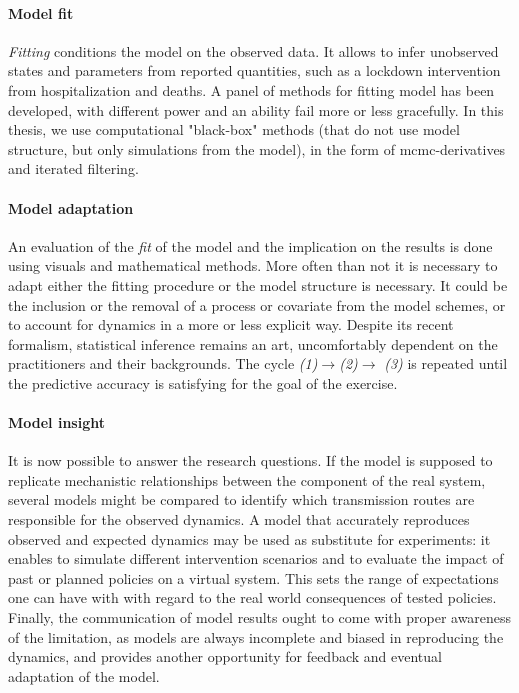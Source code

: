 \paragraph{Model fit} \textit{Fitting} conditions the model on the observed data. It allows to infer unobserved states and parameters from reported quantities, such as a lockdown intervention from hospitalization and deaths. A panel of methods for fitting model has been developed, with different power and an ability fail more or less gracefully. In this thesis, we use computational "black-box" methods (that do not use model structure, but only simulations from the model), in the form of mcmc-derivatives and iterated filtering.

\paragraph{Model adaptation} An evaluation of the \textit{fit} of the model and the implication on the results is done using visuals and mathematical methods. More often than not it is necessary to adapt either the fitting procedure or the model structure is necessary. It could be the inclusion or the removal of a process or covariate from the model schemes, or to account for dynamics in a more or less explicit way.  Despite its recent formalism, statistical inference remains an art, uncomfortably dependent on the practitioners and their backgrounds. The cycle \textit{(1)}$\rightarrow$\textit{(2)}$\rightarrow$ \textit{(3)} is repeated until the predictive accuracy is satisfying for the goal of the exercise. 

\paragraph{Model insight}  It is now possible to answer the research questions. If the model is supposed to replicate mechanistic relationships between the component of the real system, several models might be compared to identify which transmission routes are responsible for the observed dynamics. A model that accurately reproduces observed and expected dynamics may be used as substitute for experiments: it enables to simulate different intervention scenarios and to evaluate the impact of past or planned policies on a virtual system. This sets the range of expectations one can have with with regard to the real world consequences of tested policies. Finally, the communication of model results ought to come with proper awareness of the limitation, as models are always incomplete and biased in reproducing the dynamics, and provides another opportunity for feedback and eventual adaptation of the model\cite{Heesterbeek:ModelingInfectiousDisease:2015}. 


